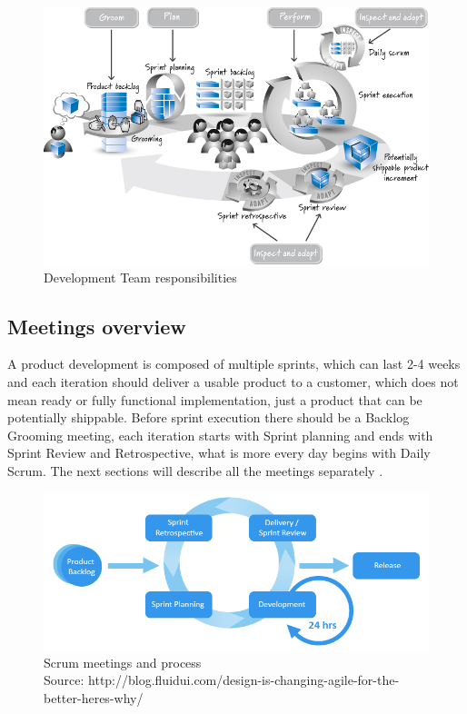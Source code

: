 \begin{figure}[h]
\caption{Development Team responsibilities \cite{ScrumBook}}
\label{fig:devtRes}
\centering
\includegraphics[width=1\textwidth]{img/developmentRes}
\end{figure}

\subsection{Meetings overview}
\label{chap:meetingsOverview}

A product development is composed of multiple sprints, which can last 2-4 weeks \cite{ScrumBook} and each iteration should deliver a usable product to a customer, which does not mean ready or fully functional implementation, just a product that can be potentially shippable. Before sprint execution there should be a Backlog Grooming meeting, each iteration starts with Sprint planning and ends with Sprint Review and Retrospective, what is more every day begins with Daily Scrum. The next sections will describe all the meetings separately \cite{ScrumBook}. 

\begin{figure}[h]
\caption{Scrum meetings and process 
\\ Source: http://blog.fluidui.com/design-is-changing-agile-for-the-better-heres-why/}
\label{fig:meetingsScrum}
\centering
\includegraphics[width=1\textwidth]{img/agile-graphic}
\end{figure}

